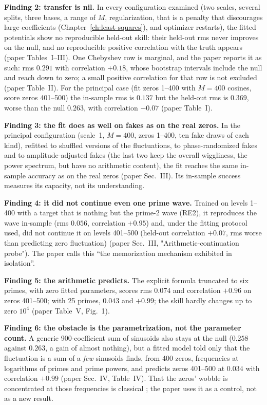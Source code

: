 \textbf{Finding 2: transfer is nil.} In every configuration examined (two scales, several splits, three bases, a range of $M$, regularization, that is a penalty that discourages large coefficients (Chapter~\ref{ch:least-squares}), and optimizer restarts), the fitted potentials show no reproducible held-out skill: their held-out rms never improves on the null, and no reproducible positive correlation with the truth appears (paper Tables~I--III). One Chebyshev row is marginal, and the paper reports it as such: rms $0.291$ with correlation $+0.18$, whose bootstrap intervals include the null and reach down to zero; a small positive correlation for that row is not excluded (paper Table~II). For the principal case (fit zeros 1--400 with $M=400$ cosines, score zeros 401--500) the in-sample rms is $0.137$ but the held-out rms is $0.369$, worse than the null $0.263$, with correlation $-0.07$ (paper Table~I).

\textbf{Finding 3: the fit does as well on fakes as on the real zeros.} In the principal configuration (scale~1, $M = 400$, zeros 1--400, ten fake draws of each kind), refitted to shuffled versions of the fluctuations, to phase-randomized fakes \cite{theiler} and to amplitude-adjusted fakes \cite{schreiber} (the last two keep the overall wiggliness, the power spectrum, but have no arithmetic content), the fit reaches the same in-sample accuracy as on the real zeros (paper Sec.~III). Its in-sample success measures its capacity, not its understanding.

\textbf{Finding 4: it did not continue even one prime wave.} Trained on levels 1--400 with a target that is nothing but the prime-2 wave (RE2), it reproduces the wave in-sample (rms $0.056$, correlation $+0.95$) and, under the fitting protocol used, did not continue it on levels 401--500 (held-out correlation $+0.07$, rms worse than predicting zero fluctuation) (paper Sec.~III, "Arithmetic-continuation probe"). The paper calls this ``the memorization mechanism exhibited in isolation''.

\textbf{Finding 5: the arithmetic predicts.} The explicit formula truncated to six primes, with zero fitted parameters, scores rms $0.074$ and correlation $+0.96$ on zeros 401--500; with 25 primes, $0.043$ and $+0.99$; the skill hardly changes up to zero $10^4$ (paper Table~V, Fig.~1).

\textbf{Finding 6: the obstacle is the parametrization, not the parameter count.} A generic 900-coefficient sum of sinusoids also stays at the null ($0.258$ against $0.263$, a gain of almost nothing), but a fitted model told only that the fluctuation is a sum of a \emph{few} sinusoids finds, from 400 zeros, frequencies at logarithms of primes and prime powers, and predicts zeros 401--500 at $0.034$ with correlation $+0.99$ (paper Sec.~IV, Table~IV). That the zeros' wobble is concentrated at those frequencies is classical \cite{landau,gonek}; the paper uses it as a control, not as a new result.

